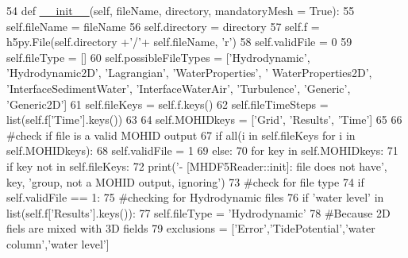\begin{DoxyCode}
54     \textcolor{keyword}{def }\mbox{\hyperlink{classxml_writer_1_1xml_writer_a0b43f6115153b244e10d1933ee33500a}{\_\_init\_\_}}(self, fileName, directory, mandatoryMesh = True):
55         self.fileName = fileName
56         self.directory = directory
57         self.f = h5py.File(self.directory +\textcolor{stringliteral}{'/'}+ self.fileName, \textcolor{stringliteral}{'r')}
58 \textcolor{stringliteral}{        self.validFile = 0}
59 \textcolor{stringliteral}{        self.fileType = []}
60 \textcolor{stringliteral}{        self.possibleFileTypes = ['Hydrodynamic'}, \textcolor{stringliteral}{'Hydrodynamic2D'}, \textcolor{stringliteral}{'Lagrangian'}, \textcolor{stringliteral}{'WaterProperties'}, \textcolor{stringliteral}{'
      WaterProperties2D'}, \textcolor{stringliteral}{'InterfaceSedimentWater'}, \textcolor{stringliteral}{'InterfaceWaterAir'}, \textcolor{stringliteral}{'Turbulence'}, \textcolor{stringliteral}{'Generic'}, \textcolor{stringliteral}{'Generic2D'}]
61         self.fileKeys = self.f.keys()
62         self.fileTimeSteps = list(self.f[\textcolor{stringliteral}{'Time'}].keys())        
63         
64         self.MOHIDkeys = [\textcolor{stringliteral}{'Grid'}, \textcolor{stringliteral}{'Results'}, \textcolor{stringliteral}{'Time'}]
65         
66         \textcolor{comment}{#check if file is a valid MOHID output}
67         \textcolor{keywordflow}{if} all(i \textcolor{keywordflow}{in} self.fileKeys \textcolor{keywordflow}{for} i \textcolor{keywordflow}{in} self.MOHIDkeys):
68             self.validFile = 1
69         \textcolor{keywordflow}{else}:
70             \textcolor{keywordflow}{for} key \textcolor{keywordflow}{in} self.MOHIDkeys:
71                 \textcolor{keywordflow}{if} key \textcolor{keywordflow}{not} \textcolor{keywordflow}{in} self.fileKeys:
72                     print(\textcolor{stringliteral}{'- [MHDF5Reader::init]: file does not have'}, key, \textcolor{stringliteral}{'group, not a MOHID output,
       ignoring'})
73         \textcolor{comment}{#check for file type}
74         \textcolor{keywordflow}{if} self.validFile == 1:
75             \textcolor{comment}{#checking for Hydrodynamic files}
76             \textcolor{keywordflow}{if} \textcolor{stringliteral}{'water level'} \textcolor{keywordflow}{in} list(self.f[\textcolor{stringliteral}{'Results'}].keys()):
77                 self.fileType = \textcolor{stringliteral}{'Hydrodynamic'}
78                 \textcolor{comment}{#Because 2D fiels are mixed with 3D fields}
79                 exclusions = [\textcolor{stringliteral}{'Error'},\textcolor{stringliteral}{'TidePotential'},\textcolor{stringliteral}{'water column'},\textcolor{stringliteral}{'water level'}]                

\end{DoxyCode}
